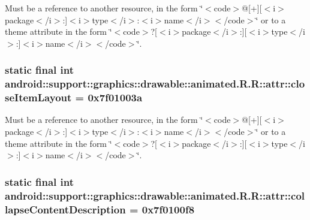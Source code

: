 Must be a reference to another resource, in the form \char`\"{}$<$code$>$@\mbox{[}+\mbox{]}\mbox{[}$<$i$>$package$<$/i$>$:\mbox{]}$<$i$>$type$<$/i$>$:$<$i$>$name$<$/i$>$$<$/code$>$\char`\"{} or to a theme attribute in the form \char`\"{}$<$code$>$?\mbox{[}$<$i$>$package$<$/i$>$:\mbox{]}\mbox{[}$<$i$>$type$<$/i$>$:\mbox{]}$<$i$>$name$<$/i$>$$<$/code$>$\char`\"{}. \hypertarget{classandroid_1_1support_1_1graphics_1_1drawable_1_1animated_1_1_r_1_1attr_0388c58bed05b38911e8ede76d18a0b7}{
\subsubsection[{closeItemLayout}]{\setlength{\rightskip}{0pt plus 5cm}static final int android::support::graphics::drawable::animated.R.R::attr::closeItemLayout = 0x7f01003a}}
\label{classandroid_1_1support_1_1graphics_1_1drawable_1_1animated_1_1_r_1_1attr_0388c58bed05b38911e8ede76d18a0b7}


Must be a reference to another resource, in the form \char`\"{}$<$code$>$@\mbox{[}+\mbox{]}\mbox{[}$<$i$>$package$<$/i$>$:\mbox{]}$<$i$>$type$<$/i$>$:$<$i$>$name$<$/i$>$$<$/code$>$\char`\"{} or to a theme attribute in the form \char`\"{}$<$code$>$?\mbox{[}$<$i$>$package$<$/i$>$:\mbox{]}\mbox{[}$<$i$>$type$<$/i$>$:\mbox{]}$<$i$>$name$<$/i$>$$<$/code$>$\char`\"{}. \hypertarget{classandroid_1_1support_1_1graphics_1_1drawable_1_1animated_1_1_r_1_1attr_eb32a146bfc885539ed6355fa1ae2e7a}{
\subsubsection[{collapseContentDescription}]{\setlength{\rightskip}{0pt plus 5cm}static final int android::support::graphics::drawable::animated.R.R::attr::collapseContentDescription = 0x7f0100f8}}
\label{classandroid_1_1support_1_1graphics_1_1drawable_1_1animated_1_1_r_1_1attr_eb32a146bfc885539ed6355fa1ae2e7a}



